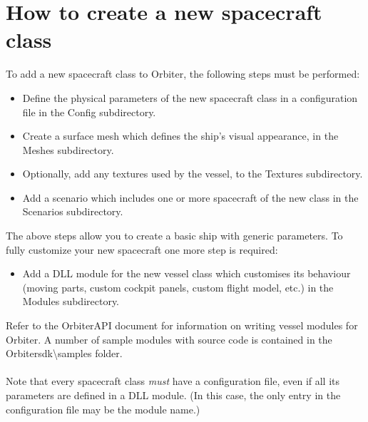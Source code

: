 \documentclass[Orbiter Developer Manual.tex]{subfiles}
\begin{document}
\section{How to create a new spacecraft class}
To add a new spacecraft class to Orbiter, the following steps must be performed:

\begin{itemize}
\item Define the physical parameters of the new spacecraft class in a configuration file in the Config subdirectory.
\item Create a surface mesh which defines the ship's visual appearance, in the Meshes subdirectory.
\item Optionally, add any textures used by the vessel, to the Textures subdirectory.
\item Add a scenario which includes one or more spacecraft of the new class in the Scenarios subdirectory.
\end{itemize}

\noindent
The above steps allow you to create a basic ship with generic parameters. To fully customize your new spacecraft one more step is required:

\begin{itemize}
\item Add a DLL module for the new vessel class which customises its behaviour (moving parts, custom cockpit panels, custom flight model, etc.) in the Modules subdirectory.
\end{itemize}

Refer to the OrbiterAPI document for information on writing vessel modules for Orbiter. A number of sample modules with source code is contained in the Orbitersdk\textbackslash samples folder.\\
\\
Note that every spacecraft class \textit{must} have a configuration file, even if all its parameters are defined in a DLL module. (In this case, the only entry in the configuration file may be the module name.)
\end{document}
